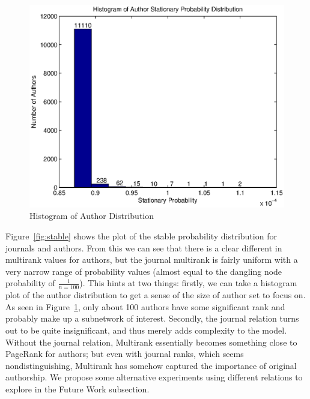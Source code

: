     \begin{figure}[h]
        \includegraphics[width=\columnwidth]{author_hist.eps}
        \caption{Histogram of Author Distribution}
        \label{fig:auth_hist}
    \end{figure}

Figure~\ref{fig:stable} shows the plot of the stable probability distribution for journals and authors. From this we can see that there is a clear different in multirank values for authors, but the journal multirank is fairly uniform with a very narrow range of probability values (almost equal to the dangling node probability of $\frac{1}{n=100}$). This hints at two things: firstly, we can take a histogram plot of the author distribution to get a sense of the size of author set to focus on. As seen in Figure~\ref{fig:auth_hist}, only about 100 authors have some significant rank and probably make up a subnetwork of interest. Secondly, the journal relation turns out to be quite insignificant, and thus merely adds complexity to the model. Without the journal relation, Multirank essentially becomes something close to PageRank for authors; but even with journal ranks, which seems nondistinguishing, Multirank has somehow captured the importance of original authorship. We propose some alternative experiments using different relations to explore in the Future Work subsection.



